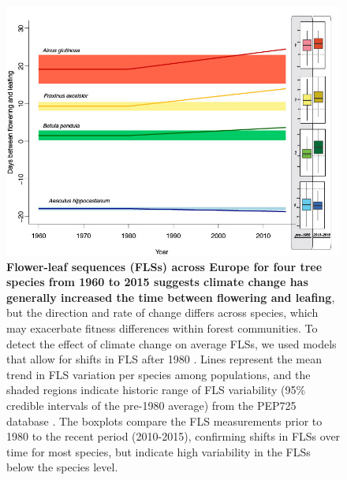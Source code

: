 \documentclass[11pt]{article}
\begin{document}
\begin{figure}[h!]
    \centering
 \includegraphics[width=\textwidth]{..//..//PEP725/FLS_climate_change_final.jpg}
    \caption{\textbf{Flower-leaf sequences (FLSs) across Europe for four tree species from 1960 to 2015 suggests climate change has generally increased the time between flowering and leafing}, but the direction and rate of change differs across species, which may exacerbate fitness differences within forest communities. To detect the effect of climate change on average FLSs, we used models that allow for shifts in FLS after 1980 \citep{Kharouba2018}. Lines represent the mean trend in FLS variation per species among populations, and the shaded regions indicate historic range of FLS variability (95\% credible intervals of the pre-1980 average) from the PEP725 database \citep{PEP725}. The boxplots compare the FLS measurements prior to 1980 to the recent period (2010-2015), confirming shifts in FLSs over time for most species, but indicate high variability in the FLSs below the species level.}
    \label{fig:climchange}
\end{figure}
\end{document}
